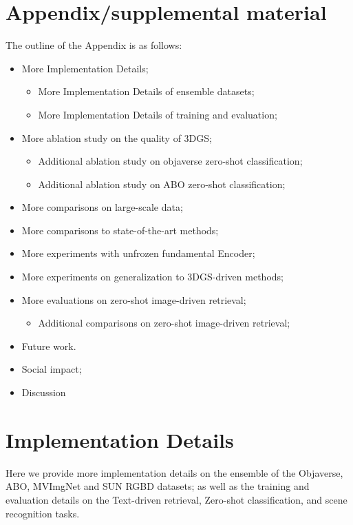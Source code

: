 \appendix
\newpage

\section{Appendix/supplemental material}
The outline of the Appendix is as follows:
\begin{itemize}
    \item More Implementation Details;
        \begin{itemize}
            \item More Implementation Details of ensemble datasets;
            \item More Implementation Details of training and evaluation;
        \end{itemize}
    \item More ablation study on the quality of 3DGS;
        \begin{itemize}
            \item Additional ablation study on objaverse zero-shot classification;
            \item Additional ablation study on ABO zero-shot classification;
        \end{itemize}
    \item More comparisons on large-scale data;
    \item More comparisons to state-of-the-art methods;
    \item More experiments with unfrozen fundamental Encoder;
    \item More experiments on generalization to 3DGS-driven methods;
    \item More evaluations on zero-shot image-driven retrieval;
        \begin{itemize}
            \item Additional comparisons on zero-shot image-driven retrieval;
        \end{itemize}
    \item Future work.
    \item Social impact;
    \item Discussion
\end{itemize}

\section{Implementation Details}
Here we provide more implementation details on the ensemble of the Objaverse\cite{deitke2023objaverse}, ABO\cite{collins2022abo}, MVImgNet\cite{yu2023mvimgnet} and SUN RGBD\cite{song2015sun} datasets; as well as the training and evaluation details on the Text-driven retrieval, Zero-shot classification, and scene recognition tasks.

